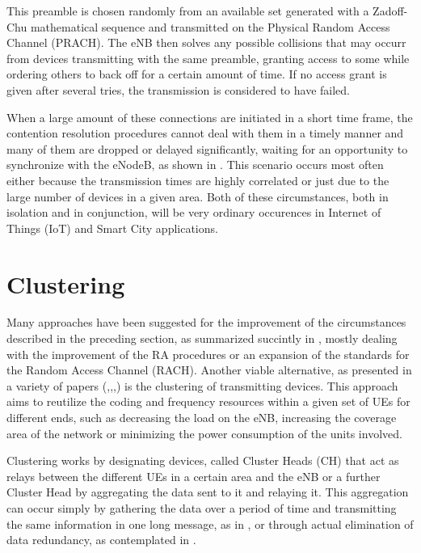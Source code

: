 This preamble is chosen randomly from an available set generated with a Zadoff-Chu mathematical sequence and transmitted on the Physical Random Access Channel (PRACH). The eNB then solves any possible collisions that may occurr from devices transmitting with the same preamble, granting access to some while ordering others to back off for a certain amount of time. If no access grant is given after several tries, the transmission is considered to have failed.

When a large amount of these connections are initiated in a short time frame, the contention resolution procedures cannot deal with them in a timely manner and many of them are dropped or delayed significantly, waiting for an opportunity to synchronize with the eNodeB, as shown in \cite{Polese2016}. This scenario occurs most often either because the transmission times are highly correlated or just due to the large number of devices in a given area. Both of these circumstances, both in isolation and in conjunction, will be very ordinary occurences in Internet of Things (IoT) and Smart City applications. 


\section{Clustering}

Many approaches have been suggested for the improvement of the circumstances described in the preceding section, as summarized succintly in \cite{Laya2014}, mostly dealing with the improvement of the RA procedures or an expansion of the standards for the Random Access Channel (RACH). Another viable alternative, as presented in a variety of papers (\cite{Wei2012a},\cite{Laya2014a},\cite{Wang2013},\cite{Liao2013}) is the clustering of transmitting devices. This approach aims to reutilize the coding and frequency resources within a given set of UEs for different ends, such as decreasing the load on the eNB, increasing the coverage area of the network or minimizing the power consumption of the units involved.

Clustering works by designating devices, called Cluster Heads (CH) that act as relays between the different UEs in a certain area and the eNB or a further Cluster Head by aggregating the data sent to it and relaying it. This aggregation can occur simply by gathering the data over a period of time and transmitting the same information in one long message, as in \cite{Shariatmadari2015}, or through actual elimination of data redundancy, as contemplated in \cite{Riker2015}.

